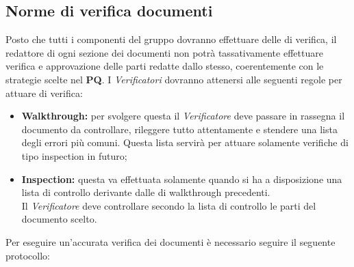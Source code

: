 \documentclass{scalatekids-article}
\begin{document}
\subsection{Norme di verifica documenti}

\label{sec:VerificaDocumenti}

Posto che tutti i componenti del gruppo dovranno effettuare delle  di
verifica, il redattore di ogni sezione dei documenti non potrà tassativamente
effettuare verifica e approvazione delle parti redatte dallo stesso,
coerentemente con le strategie scelte nel \textbf{PQ}.
I \textit{Verificatori} dovranno attenersi alle seguenti regole per attuare  di verifica:
\begin{itemize}
\item \textbf{Walkthrough:} per svolgere questa  il \textit{Verificatore} deve passare in rassegna il documento da controllare, rileggere tutto attentamente e stendere una lista degli errori più comuni. Questa lista servirà per attuare solamente verifiche di tipo inspection in futuro;
\item \textbf{Inspection:} questa  va effettuata solamente quando si ha a disposizione una lista di controllo derivante dalle  di walkthrough precedenti.\\
  Il \textit{Verificatore} deve controllare secondo la lista di controllo le parti del documento scelto.
\end{itemize}
Per eseguire un'accurata verifica dei documenti è necessario seguire il seguente
protocollo:
\end{document}
